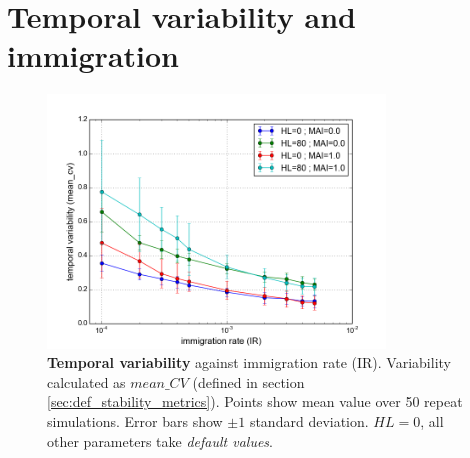%
%


\clearpage
\section{Temporal variability and immigration}
\label{sec:intro_stationarity}

\begin{figure}
	\centering
	\includegraphics[width=0.8\textwidth]{"figures/stationarity/cov_vs_ir"}
	\caption{\textbf{Temporal variability} against immigration rate (IR). Variability calculated as $mean\_CV$ (defined in section \ref{sec:def_stability_metrics}). Points show mean value over 50 repeat simulations. Error bars show $\pm 1$ standard deviation. $HL=0$, all other parameters take \emph{default values}.}
	\label{fig:cov_vs_ir}
\end{figure}


